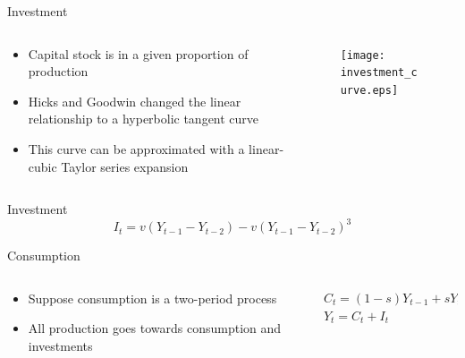 \documentclass{beamer}
\begin{document}
\begin{frame}{Investment}
	\begin{columns}
		\begin{column}{0.5\textwidth}
				\begin{itemize}
					\item
						Capital stock is in a given proportion of production\autocite{Press1939}
					\pause
					\item
						Hicks and Goodwin changed the linear relationship to a hyperbolic tangent curve
					\item
						This curve can be approximated with a linear-cubic Taylor series expansion
				\end{itemize}
		\end{column}
		\begin{column}{0.5\textwidth}
			\begin{figure}
				\centering
				\texttt{[image: investment\_curve.eps]}
			\end{figure}
		\end{column}
	\end{columns}
\end{frame}

\begin{frame}{Investment}
	\begin{equation*}
		I_t=v(Y_{t-1}-Y_{t-2})-v(Y_{t-1}-Y_{t-2})^3
	\end{equation*}
\end{frame}

\begin{frame}{Consumption}
	\begin{columns}
		\begin{column}{0.5\textwidth}
			\begin{itemize}
				\item
					Suppose consumption is a two-period process
				\item
					All production goes towards consumption and investments
			\end{itemize}
		\end{column}
		\pause
		\begin{column}{0.5\textwidth}
			\begin{gather*}
				C_t=(1-s)Y_{t-1}+sY_{t-2}\\
				Y_t=C_t+I_t
			\end{gather*}
		\end{column}
	\end{columns}
\end{frame}
\end{document}
